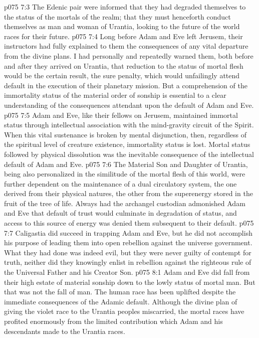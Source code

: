 \vs p075 7:3 The Edenic pair were informed that they had degraded themselves to the status of the mortals of the realm; that they must henceforth conduct themselves as man and woman of Urantia, looking to the future of the world races for their future.
\vs p075 7:4 Long before Adam and Eve left Jerusem, their instructors had fully explained to them the consequences of any vital departure from the divine plans. I had personally and repeatedly warned them, both before and after they arrived on Urantia, that reduction to the status of mortal flesh would be the certain result, the sure penalty, which would unfailingly attend default in the execution of their planetary mission. But a comprehension of the immortality status of the material order of sonship is essential to a clear understanding of the consequences attendant upon the default of Adam and Eve.
\vs p075 7:5 \pc {}\bibnobreakspace Adam and Eve, like their fellows on Jerusem, maintained immortal status through intellectual association with the mind\hyp{}gravity circuit of the Spirit. When this vital sustenance is broken by mental disjunction, then, regardless of the spiritual level of creature existence, immortality status is lost. Mortal status followed by physical dissolution was the inevitable consequence of the intellectual default of Adam and Eve.
\vs p075 7:6 \pc {}\bibnobreakspace The Material Son and Daughter of Urantia, being also personalized in the similitude of the mortal flesh of this world, were further dependent on the maintenance of a dual circulatory system, the one derived from their physical natures, the other from the superenergy stored in the fruit of the tree of life. Always had the archangel custodian admonished Adam and Eve that default of trust would culminate in degradation of status, and access to this source of energy was denied them subsequent to their default.
\vs p075 7:7 \pc Caligastia did succeed in trapping Adam and Eve, but he did not accomplish his purpose of leading them into open rebellion against the universe government. What they had done was indeed evil, but they were never guilty of contempt for truth, neither did they knowingly enlist in rebellion against the righteous rule of the Universal Father and his Creator Son.
\vs p075 8:1 Adam and Eve did fall from their high estate of material sonship down to the lowly status of mortal man. But that was not the fall of man. The human race has been uplifted despite the immediate consequences of the Adamic default. Although the divine plan of giving the violet race to the Urantia peoples miscarried, the mortal races have profited enormously from the limited contribution which Adam and his descendants made to the Urantia races.
